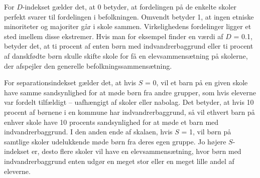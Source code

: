 \documentclass[
]{book}
\begin{document}
For \(D\)-indekset gælder det, at 0 betyder, at fordelingen på de enkelte skoler perfekt svarer til fordelingen i befolkningen. Omvendt betyder 1, at ingen etniske minoriteter og majoriter går i skole sammen. Virkelighedens fordelinger ligger et sted imellem disse ekstremer. Hvis man for eksempel finder en værdi af \(D\) = 0.1, betyder det, at ti procent af enten børn med indvandrerbaggrund eller ti procent af danskfødte børn skulle skifte skole for få en elevsammensætning på skolerne, der afspejler den generelle befolkningssammensætning.

For separationsindekset gælder det, at hvis \(S\) = 0, vil et barn på en given skole have samme sandsynlighed for at møde børn fra andre grupper, som hvis eleverne var fordelt tilfældigt -- uafhængigt af skoler eller nabolag. Det betyder, at hvis 10 procent af børnene i en kommune har indvandrerbaggrund, så vil ethvert barn på enhver skole have 10 procents sandsynlighed for at møde et barn med indvandrerbaggrund. I den anden ende af skalaen, hvis \(S\) = 1, vil børn på samtlige skoler udelukkende møde børn fra deres egen gruppe. Jo højere \(S\)-indekset er, desto flere skoler vil have en elevsammensætning, hvor børn med indvandrerbaggrund enten udgør en meget stor eller en meget lille andel af eleverne.
\end{document}
